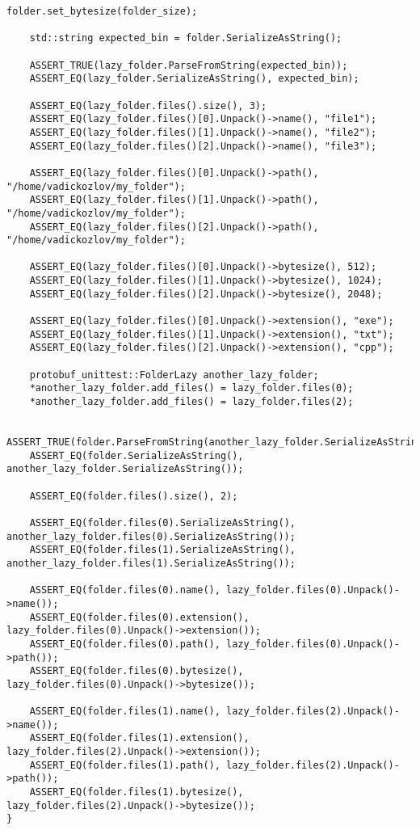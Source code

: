 \begin{lstlisting}[style=CodeListing, label=sec_testing:code:tests, caption={Реализация тестов с помощью фреймворка Google Test}]
    folder.set_bytesize(folder_size);

    std::string expected_bin = folder.SerializeAsString();

    ASSERT_TRUE(lazy_folder.ParseFromString(expected_bin));
    ASSERT_EQ(lazy_folder.SerializeAsString(), expected_bin);

    ASSERT_EQ(lazy_folder.files().size(), 3);
    ASSERT_EQ(lazy_folder.files()[0].Unpack()->name(), "file1");
    ASSERT_EQ(lazy_folder.files()[1].Unpack()->name(), "file2");
    ASSERT_EQ(lazy_folder.files()[2].Unpack()->name(), "file3");

    ASSERT_EQ(lazy_folder.files()[0].Unpack()->path(), "/home/vadickozlov/my_folder");
    ASSERT_EQ(lazy_folder.files()[1].Unpack()->path(), "/home/vadickozlov/my_folder");
    ASSERT_EQ(lazy_folder.files()[2].Unpack()->path(), "/home/vadickozlov/my_folder");

    ASSERT_EQ(lazy_folder.files()[0].Unpack()->bytesize(), 512);
    ASSERT_EQ(lazy_folder.files()[1].Unpack()->bytesize(), 1024);
    ASSERT_EQ(lazy_folder.files()[2].Unpack()->bytesize(), 2048);

    ASSERT_EQ(lazy_folder.files()[0].Unpack()->extension(), "exe");
    ASSERT_EQ(lazy_folder.files()[1].Unpack()->extension(), "txt");
    ASSERT_EQ(lazy_folder.files()[2].Unpack()->extension(), "cpp");

    protobuf_unittest::FolderLazy another_lazy_folder;
    *another_lazy_folder.add_files() = lazy_folder.files(0);
    *another_lazy_folder.add_files() = lazy_folder.files(2);

    ASSERT_TRUE(folder.ParseFromString(another_lazy_folder.SerializeAsString()));
    ASSERT_EQ(folder.SerializeAsString(), another_lazy_folder.SerializeAsString());

    ASSERT_EQ(folder.files().size(), 2);

    ASSERT_EQ(folder.files(0).SerializeAsString(), another_lazy_folder.files(0).SerializeAsString());
    ASSERT_EQ(folder.files(1).SerializeAsString(), another_lazy_folder.files(1).SerializeAsString());

    ASSERT_EQ(folder.files(0).name(), lazy_folder.files(0).Unpack()->name());
    ASSERT_EQ(folder.files(0).extension(), lazy_folder.files(0).Unpack()->extension());
    ASSERT_EQ(folder.files(0).path(), lazy_folder.files(0).Unpack()->path());
    ASSERT_EQ(folder.files(0).bytesize(), lazy_folder.files(0).Unpack()->bytesize());

    ASSERT_EQ(folder.files(1).name(), lazy_folder.files(2).Unpack()->name());
    ASSERT_EQ(folder.files(1).extension(), lazy_folder.files(2).Unpack()->extension());
    ASSERT_EQ(folder.files(1).path(), lazy_folder.files(2).Unpack()->path());
    ASSERT_EQ(folder.files(1).bytesize(), lazy_folder.files(2).Unpack()->bytesize());
}


\end{lstlisting}
